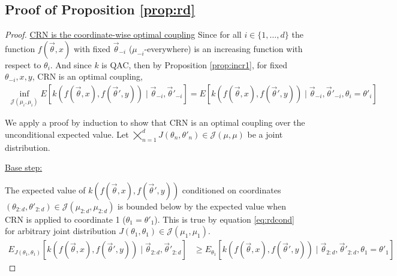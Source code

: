 \documentclass[12pt]{article}
\theoremstyle{plain}%
\theoremstyle{definition}
\begin{document}
	\subsection{Proof of Proposition \ref{prop:rd}}\label{pf:rdinduction}
\begin{proof}
	\underline{CRN is the coordinate-wise optimal coupling}
	Since for all $i\in\{1,\ldots, d\}$ the function 
	$f(\vec{\theta},x)$ with fixed $\vec{\theta}_{-i}$ ($\mu_{-i}$-everywhere) is an increasing function with respect to $\theta_i$. And since $k$ is QAC, then by Proposition \ref{prop:incr1}, for fixed $\theta_{-i},x,y$, CRN is an optimal coupling,
	\begin{align}\label{eq:rdcond}
		\inf_{\mathcal{J}(\mu_i,\mu_i)}E[k(f( \vec{\theta},x),f(\vec{\theta}',y))\mid \vec{\theta}_{-i},\vec{\theta}'_{-i}]=E[k(f(\vec{\theta},x),f( \vec{\theta}',y))\mid \vec{\theta}_{-i},\vec{\theta}'_{-i}, \theta_i=\theta'_i]
	\end{align}
	
	We apply a proof by induction to show that CRN is an optimal coupling over the unconditional expected value. Let $\bigtimes_{n=1}^d J(\theta_n,\theta'_{n})\in \mathcal{J}(\mu,\mu)$ be a joint distribution. 
	
	\underline{Base step:} 
	
The expected value of $k(f( \vec{\theta},x), f(\vec{\theta}',y))$ conditioned on coordinates $(\theta_{2:d},\theta'_{2:d})\in \mathcal{J}(\mu_{2:d},\mu_{2:d})$ is bounded below by the expected value %
	when CRN is applied to coordinate 1 ($\theta_1=\theta'_1$). This is true by equation \ref{eq:rdcond} for arbitrary joint distribution $J(\theta_1,\theta_{1})\in \mathcal{J}(\mu_1,\mu_1)$.
	\begin{align*}
		E_{J(\theta_1,\theta_{1})}[k(f( \vec{\theta},x),f(\vec{\theta}',y))\mid \vec{\theta}_{2:d}, \vec{\theta}'_{2:d}]&\geq E_{\theta_1}[k(f( \vec{\theta},x),f(\vec{\theta}',y))\mid \vec{\theta}_{2:d}, \vec{\theta}'_{2:d}, \theta_1=\theta'_1]
	\end{align*}
	

\end{proof}
\end{document}
